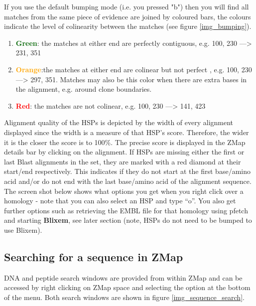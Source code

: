 \documentclass[letterpaper]{article}
\begin{document}
If you use the default bumping mode (i.e. you pressed "b") then you will find all matches from the same piece of evidence are joined by coloured bars, the colours indicate the level of colinearity between the matches (see figure \ref{img_bumping}).
\begin{enumerate}
\item \textcolor{darkgreen}{\textbf{Green}}: the matches at either end are perfectly contiguous, e.g. 100, 230 ---> 231, 351
\item \textcolor{orange}{\textbf{Orange}}:the matches at either end are colinear but not perfect , e.g. 100, 230 ---> 297, 351. Matches may also be this color when there are extra bases in the alignment, e.g. around clone boundaries.
\item \textcolor{red}{\textbf{Red}}: the matches are not colinear, e.g. 100, 230 ---> 141, 423
\end{enumerate}

Alignment quality of the HSPs is depicted by the width of every alignment displayed since the width is a measure of that HSP's score. Therefore, the wider it is the closer the score is to 100\%. The precise score is displayed in the ZMap details bar by clicking on the alignment. If HSPs are missing either the first or last Blast alignments in the set, they are marked with a red diamond at their start/end respectively. This indicates if they do not start at the first base/amino acid and/or do not end with the last base/amino acid of the alignment sequence. The screen shot below shows what options you get when you right click over a homology - note that you can also select an HSP and type ``o''. You also get further options such as retrieving the EMBL file for that homology using pfetch and starting \textbf{Blixem}, see later section (note, HSPs do not need to be bumped to use Blixem).

\subsection{Searching for a sequence in ZMap}
DNA and peptide search windows are provided from within ZMap and can be accessed by right clicking on ZMap space and selecting the option at the bottom of the menu. Both search windows are shown in figure \ref{img_sequence_search}.
\end{document}
